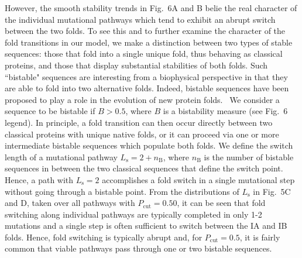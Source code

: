 \documentclass[
aip,
rsi,%
amsmath,amssymb,
reprint,%
]{revtex4-1}
\newcommand {\Pcut}     	{{P_\mathrm{cut}}}
\begin{document}

However, the smooth stability trends in Fig.~6A and B belie the real character of the individual mutational pathways which tend to exhibit an abrupt switch between the two folds. To see this and to further examine the character of the fold transitions in our model, we make a distinction between two types of stable sequences: those that fold into a single unique fold, thus behaving as classical proteins, and those that display substantial stabilities of both folds. Such ``bistable" sequences are interesting from a biophysical perspective in that they are able to fold into two alternative folds. Indeed, bistable sequences have been proposed to play a role in the evolution of new protein folds.~\cite{Sikosek2012} We consider a sequence to be bistable if $B>0.5$, where $B$ is a bistability measure (see Fig.~6 legend). In principle, a fold transition can then occur directly between two classical proteins with unique native folds, or it can proceed via one or more intermediate bistable sequences which populate both folds. We define the switch length of a mutational pathway $L_\mathrm{s}=2+n_\mathrm{B}$, where $n_\mathrm{B}$ is the number of bistable sequences in between the two classical sequences that define the switch point. Hence, a path with $L_\mathrm{s}=2$ accomplishes a fold switch in a single mutational step without going through a bistable point. From the distributions of  $L_\mathrm{s}$ in Fig.~5C and D, taken over all pathways with $\Pcut=0.50$, it can be seen that fold switching along individual pathways are typically completed in only 1-2 mutations and a single step is often sufficient to switch between the IA and IB folds. Hence, fold switching is typically abrupt and, for $\Pcut = 0.5$, it is fairly common that viable pathways pass through one or two bistable sequences. 
\end{document}
